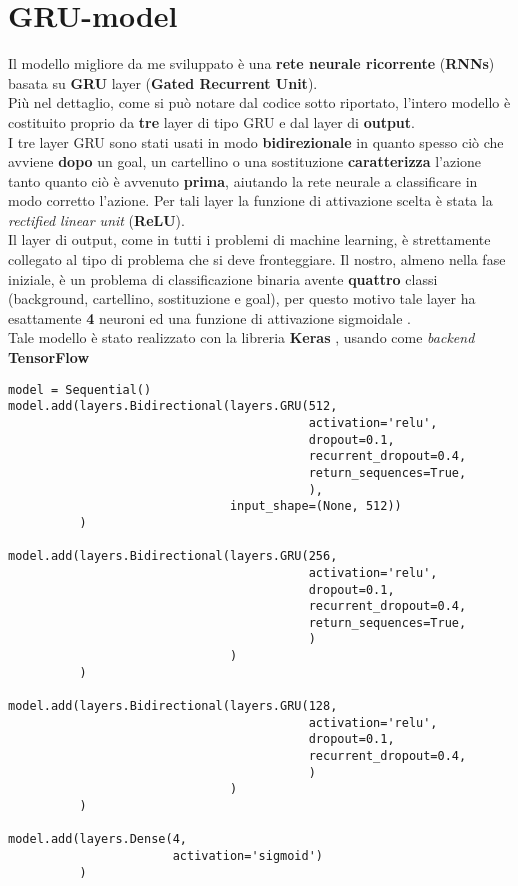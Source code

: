 \section{GRU-model}
\label{section : grumodel}
Il modello migliore da me sviluppato è una \textbf{rete neurale ricorrente} (\textbf{RNNs}) basata su \textbf{GRU} layer (\textbf{Gated Recurrent Unit}). 
\\Più nel dettaglio, come si può notare dal codice sotto riportato, l'intero modello è costituito proprio da \textbf{tre} layer di tipo GRU e dal layer di \textbf{output}.
\\I tre layer GRU sono stati usati in modo \textbf{bidirezionale} in quanto spesso ciò che avviene \textbf{dopo} un goal, un cartellino o una sostituzione \textbf{caratterizza} l'azione tanto quanto ciò è avvenuto \textbf{prima}, aiutando la rete neurale a classificare in modo corretto l'azione. Per tali layer la funzione di attivazione scelta è stata la \textit{rectified linear unit} (\textbf{ReLU}). \cite{DeepLearningPython}
\\Il layer di output, come in tutti i problemi di machine learning, è strettamente collegato al tipo di problema che si deve fronteggiare. Il nostro, almeno nella fase iniziale, è un problema di classificazione binaria avente \textbf{quattro} classi (background, cartellino, sostituzione e goal), per questo motivo tale layer ha esattamente \textbf{4} neuroni ed una funzione di attivazione sigmoidale .
\\Tale modello è stato realizzato con la libreria \textbf{Keras} \cite{chollet2015keras}, usando come \textit{backend} \textbf{TensorFlow} \cite{tensorflow2015-whitepaper}
\begin{verbatim}
model = Sequential()
model.add(layers.Bidirectional(layers.GRU(512,
                                          activation='relu',
                                          dropout=0.1,
                                          recurrent_dropout=0.4,
                                          return_sequences=True,
                                          ),
                               input_shape=(None, 512))
          )

model.add(layers.Bidirectional(layers.GRU(256,
                                          activation='relu',
                                          dropout=0.1,
                                          recurrent_dropout=0.4,
                                          return_sequences=True,
                                          )
                               )
          )

model.add(layers.Bidirectional(layers.GRU(128,
                                          activation='relu',
                                          dropout=0.1,
                                          recurrent_dropout=0.4,
                                          )
                               )
          )

model.add(layers.Dense(4,
                       activation='sigmoid')
          )
\end{verbatim}
